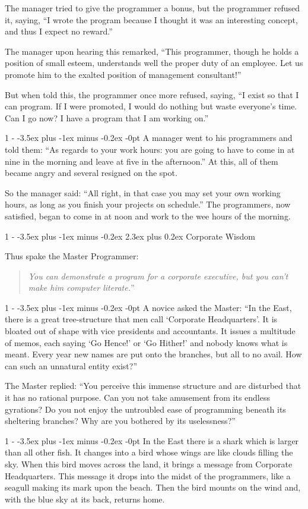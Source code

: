 \documentclass[12pt,letterpaper,titlepage]{article}
\makeatletter
\newlength{\intomargin}\setlength{\intomargin}{25pt}
\renewcommand{\section}{%
\@startsection{section}%
{1}%
{-\intomargin}%
{-3.5ex plus -1ex minus -0.2ex}%
{2.3ex plus 0.2ex}%
{\clearpage\normalfont\Large\bfseries}%
}
\renewcommand{\subsection}{%
\@startsection{subsection}%
{1}%
{-\intomargin}%
{-3.5ex plus -1ex minus -0.2ex}%
{-0pt}%
{\normalfont\normalsize\bfseries}%
}
\newcommand{\book}[2]{\section{#1}\par\hspace{-\intomargin}Thus spake the Master Programmer:%
\begin{quotation}\noindent\llap{``}\textsl{#2}''\end{quotation}\medskip}
\newcommand{\sect}{\subsection{}}
\makeatother
\begin{document}
The manager tried to give the programmer a bonus, but the programmer
refused it, saying, ``I wrote the program because I thought it was an
interesting concept, and thus I expect no reward.''

The manager upon hearing this remarked, ``This programmer, though he
holds a position of small esteem, understands well the proper duty of
an employee. Let us promote him to the exalted position of management
consultant!''

But when told this, the programmer once more refused, saying, ``I
exist so that I can program. If I were promoted, I would do nothing
but waste everyone's time. Can I go now? I have a program that I am
working on.''

\sect
A manager went to his programmers and told them: ``As regards to your
work hours: you are going to have to come in at nine in the morning
and leave at five in the afternoon.'' At this, all of them became
angry and several resigned on the spot.

So the manager said: ``All right, in that case you may set your own
working hours, as long as you finish your projects on schedule.'' The
programmers, now satisfied, began to come in at noon and work to the
wee hours of the morning.

\book{Corporate Wisdom}%
{You can demonstrate a program for a corporate executive,
but you can't make him computer literate.}

\sect
A novice asked the Master: ``In the East, there is a great
tree-structure that men call `Corporate Headquarters'. It is bloated
out of shape with vice presidents and accountants. It issues a
multitude of memos, each saying `Go Hence!' or `Go Hither!' and nobody
knows what is meant. Every year new names are put onto the branches,
but all to no avail. How can such an unnatural entity exist?''

The Master replied: ``You perceive this immense structure and are
disturbed that it has no rational purpose. Can you not take amusement
from its endless gyrations? Do you not enjoy the untroubled ease of
programming beneath its sheltering branches? Why are you bothered by
its uselessness?''

\sect
In the East there is a shark which is larger than all other fish. It
changes into a bird whose wings are like clouds filling the sky. When
this bird moves across the land, it brings a message from Corporate
Headquarters. This message it drops into the midst of the programmers,
like a seagull making its mark upon the beach. Then the bird mounts on
the wind and, with the blue sky at its back, returns home.
\end{document}
